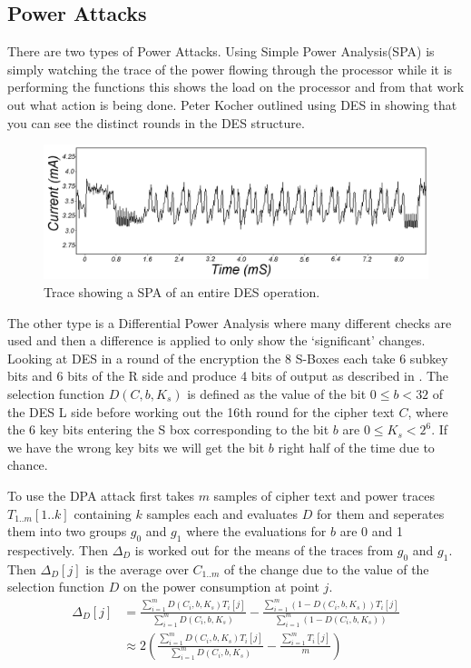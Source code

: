 \documentclass[a4paper,12pt]{article}
\begin{document}
\subsection{Power Attacks}
There are two types of Power Attacks. Using Simple Power Analysis(SPA) is simply watching the trace of the power flowing through the processor while it is performing the functions this shows the load on the processor and from that work out what action is being done. Peter Kocher outlined using DES in \cite{kocherPower} showing that you can see the distinct rounds in the DES structure. 

\begin{figure}
    \includegraphics[width=\textwidth]{SPAtrace.png}
    \caption{Trace showing a SPA of an entire DES operation.}
    \label{fig:desRound}
\end{figure}
The other type is a Differential Power Analysis where many different checks are used and then a difference is applied to only show the `significant' changes. Looking at DES in a round of the encryption the 8 S-Boxes each take 6 subkey bits and 6 bits of the R side and produce 4 bits of output as described in \cite{otherPaper}. The selection function $D(C,b,K_s)$ is defined as the value of the bit $0 \le b < 32$ of the DES L side before working out the 16th round for the cipher text $C$, where the 6 key bits entering the S box corresponding to the bit $b$ are $0 \le K_s < 2^6$. If we have the wrong key bits we will get the bit $b$ right half of the time due to chance. 

To use the DPA attack first takes $m$ samples of cipher text and power traces $T_{1..m}[1..k]$ containing $k$ samples each and evaluates $D$ for them and seperates them into two groups $g_0$ and $g_1$ where the evaluations for $b$ are 0 and 1 respectively. Then $\Delta_D$ is worked out for the means of the traces from $g_0$ and $g_1$. Then $\Delta_D[j]$ is the average over $C_{1..m}$ of the change due to the value of the selection function $D$ on the power consumption at point $j$. 
\begin{align}
    \Delta_D[j] &= \frac{\sum_{i=1}^mD(C_i,b,K_s)T_i[j]}{\sum_{i=1}^mD(C_i,b,K_s)} -  \frac{\sum_{i=1}^m(1-D(C_i,b,K_s))T_i[j]}{\sum_{i=1}^m(1-D(C_i,b,K_s))}\\
    &\approx 2( \frac{\sum_{i=1}^mD(C_i,b,K_s)T_i[j]}{\sum_{i=1}^mD(C_i,b,K_s)} - \frac{\sum_{i=1}^mT_i[j]}{m}) 
\end{align}
\end{document}
